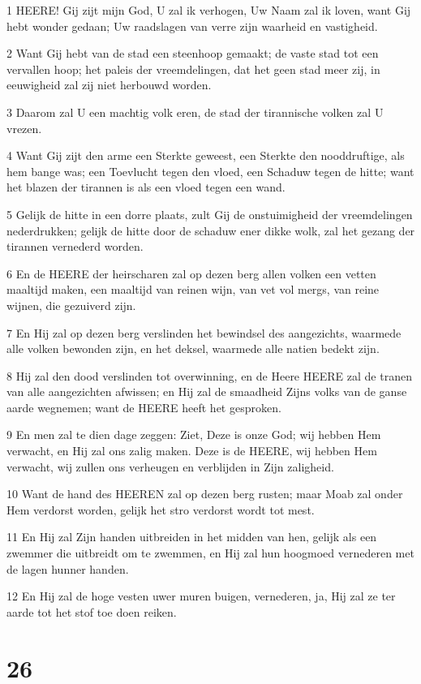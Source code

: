 \par 1 HEERE! Gij zijt mijn God, U zal ik verhogen, Uw Naam zal ik loven, want Gij hebt wonder gedaan; Uw raadslagen van verre zijn waarheid en vastigheid.
\par 2 Want Gij hebt van de stad een steenhoop gemaakt; de vaste stad tot een vervallen hoop; het paleis der vreemdelingen, dat het geen stad meer zij, in eeuwigheid zal zij niet herbouwd worden.
\par 3 Daarom zal U een machtig volk eren, de stad der tirannische volken zal U vrezen.
\par 4 Want Gij zijt den arme een Sterkte geweest, een Sterkte den nooddruftige, als hem bange was; een Toevlucht tegen den vloed, een Schaduw tegen de hitte; want het blazen der tirannen is als een vloed tegen een wand.
\par 5 Gelijk de hitte in een dorre plaats, zult Gij de onstuimigheid der vreemdelingen nederdrukken; gelijk de hitte door de schaduw ener dikke wolk, zal het gezang der tirannen vernederd worden.
\par 6 En de HEERE der heirscharen zal op dezen berg allen volken een vetten maaltijd maken, een maaltijd van reinen wijn, van vet vol mergs, van reine wijnen, die gezuiverd zijn.
\par 7 En Hij zal op dezen berg verslinden het bewindsel des aangezichts, waarmede alle volken bewonden zijn, en het deksel, waarmede alle natien bedekt zijn.
\par 8 Hij zal den dood verslinden tot overwinning, en de Heere HEERE zal de tranen van alle aangezichten afwissen; en Hij zal de smaadheid Zijns volks van de ganse aarde wegnemen; want de HEERE heeft het gesproken.
\par 9 En men zal te dien dage zeggen: Ziet, Deze is onze God; wij hebben Hem verwacht, en Hij zal ons zalig maken. Deze is de HEERE, wij hebben Hem verwacht, wij zullen ons verheugen en verblijden in Zijn zaligheid.
\par 10 Want de hand des HEEREN zal op dezen berg rusten; maar Moab zal onder Hem verdorst worden, gelijk het stro verdorst wordt tot mest.
\par 11 En Hij zal Zijn handen uitbreiden in het midden van hen, gelijk als een zwemmer die uitbreidt om te zwemmen, en Hij zal hun hoogmoed vernederen met de lagen hunner handen.
\par 12 En Hij zal de hoge vesten uwer muren buigen, vernederen, ja, Hij zal ze ter aarde tot het stof toe doen reiken.

\chapter{26}

